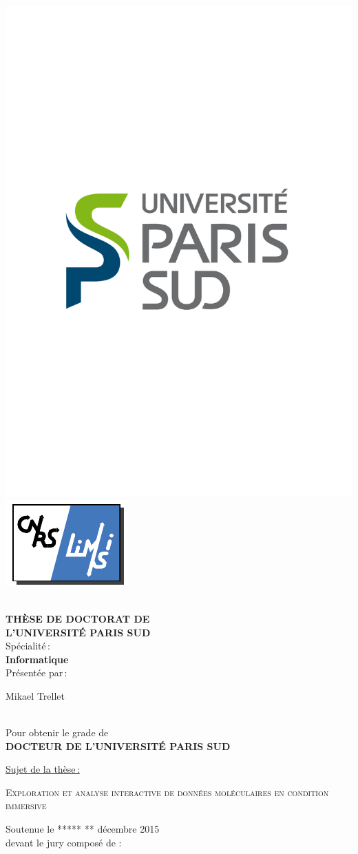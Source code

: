 \begin{titlepage}

\includegraphics[height=2.cm]{./figures/LogoUPSUD.pdf}\hfill
\includegraphics[height=2.cm]{./figures/limsilogo_vectoriel.pdf}\hfill
\\
\\



\begin{center}
 \textbf{THÈSE DE DOCTORAT DE\\ L'UNIVERSITÉ PARIS SUD\\}
Spécialité\,:\\
\textbf{Informatique}\\ 
Présentée par\,:\\ 
\begin{LARGE}
Mikael Trellet\end{LARGE}\\
Pour obtenir le grade de\\
\textbf{DOCTEUR DE L'UNIVERSITÉ PARIS SUD}
\end{center}

\noindent \underline{Sujet de la thèse\,:}\\
\begin{center}
\begin{Large}
{\textsc{Exploration et analyse interactive de données moléculaires en condition immersive}}
\end{Large}
\end{center}

Soutenue le ***** ** décembre 2015\\

devant le jury composé de :\\
\begin{center}
	\begin{tabular}{l l l}
	

\end{tabular}
\end{center}
\end{titlepage}
